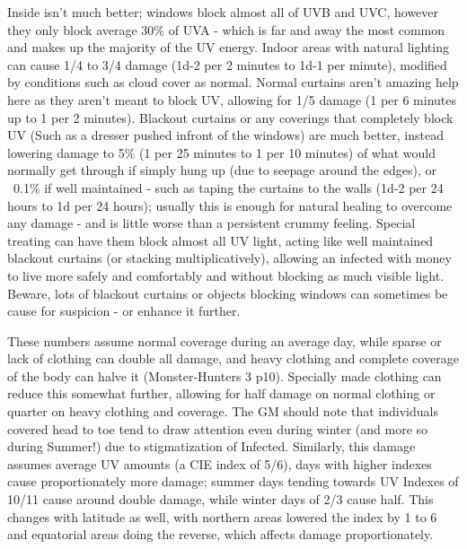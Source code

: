 \begin{multicols*}{3}
	Inside isn't much better; windows block almost all of UVB and UVC, however they only block average 30\% of UVA - which is far and away the most common and makes up the majority of the UV energy. Indoor areas with natural lighting can cause 1/4 to 3/4 damage (1d-2 per 2 minutes to 1d-1 per minute), modified by conditions such as cloud cover as normal. Normal curtains aren't amazing help here as they aren't meant to block UV, allowing for 1/5 damage (1 per 6 minutes up to 1 per 2 minutes). Blackout curtains or any coverings that completely block UV (Such as a dresser pushed infront of the windows) are much better, instead lowering damage to 5\% (1 per 25 minutes to 1 per 10 minutes) of what would normally get through if simply hung up (due to seepage around the edges), or ~0.1\% if well maintained - such as taping the curtains to the walls (1d-2 per 24 hours to 1d per 24 hours); usually this is enough for natural healing to overcome any damage - and is little worse than a persistent crummy feeling. Special treating can have them block almost all UV light, acting like well maintained blackout curtains (or stacking multiplicatively), allowing an infected with money to live more safely and comfortably and without blocking as much visible light. Beware, lots of blackout curtains or objects blocking windows can sometimes be cause for suspicion - or enhance it further.
	
	These numbers assume normal coverage during an average day, while sparse or lack of clothing can double all damage, and heavy clothing and complete coverage of the body can halve it (Monster-Hunters 3 p10). Specially made clothing can reduce this somewhat further, allowing for half damage on normal clothing or quarter on heavy clothing and coverage. The GM should note that individuals covered head to toe tend to draw attention even during winter (and more so during Summer!) due to stigmatization of Infected. Similarly, this damage assumes average UV amounts (a CIE index of 5/6), days with higher indexes cause proportionately more damage; summer days tending towards UV Indexes of 10/11 cause around double damage, while winter days of 2/3 cause half. This changes with latitude as well, with northern areas lowered the index by 1 to 6 and equatorial areas doing the reverse, which affects damage proportionately.
			

\end{multicols*}
